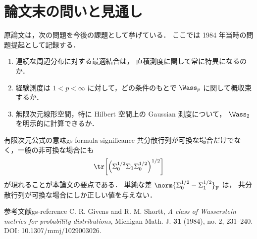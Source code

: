 \chapter{論文末の問いと見通し}
\label{ch:questions}

原論文は，次の問題を今後の課題として挙げている．
ここでは 1984 年当時の問題提起として記録する．

\begin{enumerate}
  \item 連続な周辺分布に対する最適結合は，
    直積測度に関して常に特異になるのか．
  \item 経験測度は $1<p<\infty$ に対して，どの条件のもとで
    $\Wass_p$ に関して概収束するか．
  \item 無限次元線形空間，特に Hilbert 空間上の Gaussian 測度について，
    $\Wass_2$ を明示的に計算できるか．
\end{enumerate}

\begin{remark}{有限次元公式の意味}{gs-formula-significance}
  共分散行列が可換な場合だけでなく，一般の非可換な場合にも
  \[
    \tr\!\left[
      \left(
        \Sigma_0^{1/2}\Sigma_1\Sigma_0^{1/2}
      \right)^{1/2}
    \right]
  \]
  が現れることが本論文の要点である．
  単純な差 $\norm{\Sigma_0^{1/2}-\Sigma_1^{1/2}}_{\mathrm{F}}$ は，
  共分散行列が可換な場合にしか正しい値を与えない．
\end{remark}

\begin{remark}{参考文献}{gs-reference}
  C. R. Givens and R. M. Shortt,
  \emph{A class of Wasserstein metrics for probability distributions},
  Michigan Math. J. \textbf{31} (1984), no. 2, 231--240.
  DOI: 10.1307/mmj/1029003026.
\end{remark}
